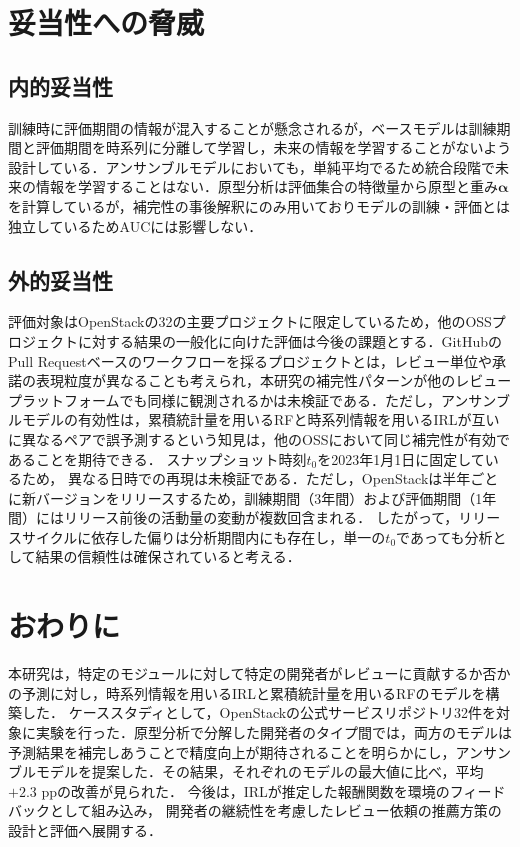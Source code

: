 \documentclass[submit,noauthor,ses,dvipdfmx]{ipsj}
\begin{document}
\section{妥当性への脅威}\label{sec:validity}

\subsection{内的妥当性}
訓練時に評価期間の情報が混入することが懸念されるが，ベースモデルは訓練期間と評価期間を時系列に分離して学習し，未来の情報を学習することがないよう設計している．アンサンブルモデルにおいても，単純平均でるため統合段階で未来の情報を学習することはない．原型分析は評価集合の特徴量から原型と重み$\bm{\alpha}$を計算しているが，補完性の事後解釈にのみ用いておりモデルの訓練・評価とは独立しているためAUCには影響しない．

\subsection{外的妥当性}
評価対象はOpenStackの32の主要プロジェクトに限定しているため，他のOSSプロジェクトに対する結果の一般化に向けた評価は今後の課題とする．GitHubのPull Requestベースのワークフローを採るプロジェクトとは，レビュー単位や承諾の表現粒度が異なることも考えられ，本研究の補完性パターンが他のレビュープラットフォームでも同様に観測されるかは未検証である．ただし，アンサンブルモデルの有効性は，累積統計量を用いるRFと時系列情報を用いるIRLが互いに異なるペアで誤予測するという知見は，他のOSSにおいて同じ補完性が有効であることを期待できる．
スナップショット時刻$t_0$を2023年1月1日に固定しているため，
異なる日時での再現は未検証である．ただし，OpenStackは半年ごとに新バージョンをリリースするため，訓練期間（3年間）および評価期間（1年間）にはリリース前後の活動量の変動が複数回含まれる．
したがって，リリースサイクルに依存した偏りは分析期間内にも存在し，単一の$t_0$であっても分析として結果の信頼性は確保されていると考える．

\section{おわりに}\label{sec:conclusion}
本研究は，特定のモジュールに対して特定の開発者がレビューに貢献するか否かの予測に対し，時系列情報を用いるIRLと累積統計量を用いるRFのモデルを構築した．
ケーススタディとして，OpenStackの公式サービスリポジトリ32件を対象に実験を行った．原型分析で分解した開発者のタイプ間では，両方のモデルは予測結果を補完しあうことで精度向上が期待されることを明らかにし，アンサンブルモデルを提案した．その結果，それぞれのモデルの最大値に比べ，平均$+2.3$ ppの改善が見られた．
今後は，IRLが推定した報酬関数を環境のフィードバックとして組み込み，
開発者の継続性を考慮したレビュー依頼の推薦方策の設計と評価へ展開する．
\end{document}

